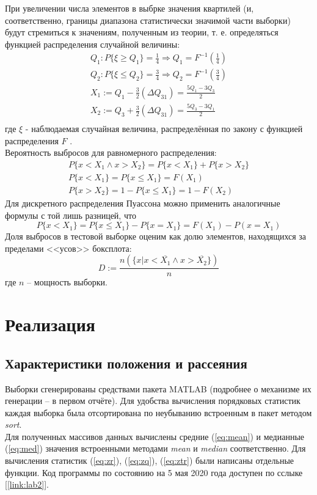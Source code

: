 \documentclass[zuev_report2.tex]{subfiles}
\begin{document}
При увеличении числа элементов в выбрке значения квартилей (и, соответственно, границы диапазона статистически значимой части выборки) будут стремиться к значениям, полученным из теории, т. е. определяться функцией распределения случайной величины:
\begin{gather*}
Q_1 : P\{\xi \ge Q_1\} = \frac{1}{4} \Rightarrow Q_1 = F^{-1}\left(\frac{1}{4}\right)\\
Q_2 : P\{\xi \le Q_2\} = \frac{3}{4} \Rightarrow Q_2 = F^{-1}\left(\frac{3}{4}\right)\\
X_1 := Q_1 - \frac{3}{2}(\Delta Q_{31}) = \frac{5Q_1-3Q_3}{2}\\
X_2 := Q_3 + \frac{3}{2}(\Delta Q_{31}) = \frac{5Q_3-3Q_1}{2}\\
\end{gather*}
где $\xi$ - наблюдаемая случайная величина, распределённая по закону с функцией распределения $F$ \cite{sevastianov}.\\
Вероятность выбросов для равномерного распределения:
\begin{gather} 
\label{eq:outliers_probab1}
P\{x<X_1 \wedge x>X_2\} = P\{x<X_1\}+P\{x>X_2\}\\
\label{eq:outliers_probab2}
P\{x<X_1\} = P\{x \le X_1\} = F(X_1)\\
\label{eq:outliers_probab3}
P\{x>X_2\} = 1 - P\{x\le X_1\} = 1 - F(X_2)
\end{gather}
Для дискретного распределения Пуассона можно применить аналогичные формулы с той лишь разницей, что 
\begin{equation}\label{eq:poisson_outliers}
P\{x<X_1\} = P\{x \le X_1\} - P\{x=X_1\} = F(X_1)-P(x=X_1)
\end{equation}
Доля выбросов в тестовой выборке оценим как долю элементов, находящихся за пределами <<усов>> боксплота:
\begin{equation}\label{eq:outliers_fraction}
D := \frac{n(\{x | x<\overline{X_1} \wedge x>\overline{X_2}\})}{n}
\end{equation}
где $n$ -- мощность выборки.


\newpage
\section{Реализация}
\subsection{Характеристики положения и рассеяния}
Выборки сгенерированы средствами пакета MATLAB (подробнее о механизме их генерации -- в первом отчёте). Для удобства вычисления порядковых статистик каждая выборка была отсортирована по неубыванию встроенным в пакет методом \emph{sort}.\\
Для полученных массивов данных вычислены средние (\ref{eq:mean}) и медианные (\ref{eq:med}) значения встроенными методами \emph{mean} и \emph{median} соответственно. Для вычисления статистик (\ref{eq:zr}), (\ref{eq:zq}), (\ref{eq:ztr}) были написаны отдельные функции. Код программы по состоянию на 5 мая 2020 года доступен по сслыке [\ref{link:lab2}].\\
\end{document}
